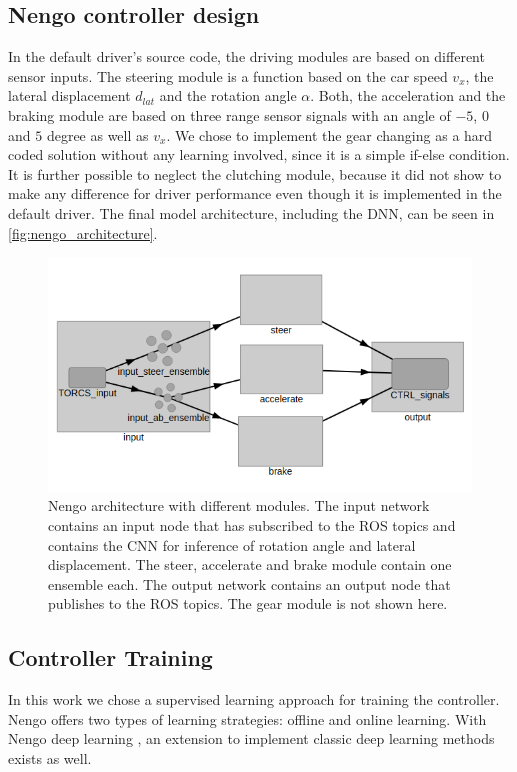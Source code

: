 \documentclass[10pt,a4paper,twoside,journal]{IEEEtran}
\begin{document}
\subsection{Nengo controller design}
In the default driver's source code, the driving modules are based on different sensor inputs. The steering module is a function based on the car speed $v_x$, the lateral displacement $d_{lat}$ and the rotation angle $\alpha$. Both, the acceleration and the braking module are based on three range sensor signals with an angle of $-5$, $0$ and $5$ degree as well as $v_x$. We chose to implement the gear changing as a hard coded solution without any learning involved, since it is a simple if-else condition. It is further possible to neglect the clutching module, because it did not show to make any difference for driver performance even though it is implemented in the default driver. The final model architecture, including the DNN, can be seen in \autoref{fig:nengo_architecture}.\\
\begin{figure}[ht]
	\centering
	\includegraphics[width=\columnwidth]{attachments/nengo_architecture.png}
	\caption{Nengo architecture with different modules. The input network contains an input node that has subscribed to the ROS topics and contains the CNN for inference of rotation angle and lateral displacement. The steer, accelerate and brake module contain one ensemble each. The output network contains an output node that publishes to the ROS topics. The gear module is not shown here.}
	\label{fig:nengo_architecture}
\end{figure}

\subsection{Controller Training}
In this work we chose a supervised learning approach for training the controller. Nengo offers two types of learning strategies: offline and online learning.
With Nengo deep learning \cite{nengo_dl}, an extension to implement classic deep learning methods exists as well.
\end{document}
